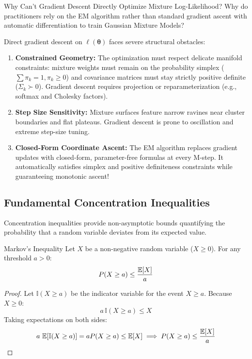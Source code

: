 \begin{ponderbox}{Why Can't Gradient Descent Directly Optimize Mixture Log-Likelihood?}
Why do practitioners rely on the EM algorithm rather than standard gradient ascent with automatic differentiation to train Gaussian Mixture Models?

\tcblower
Direct gradient descent on $\ell(\boldsymbol{\theta})$ faces severe structural obstacles:
\begin{enumerate}
    \item \textbf{Constrained Geometry:} The optimization must respect delicate manifold constraints: mixture weights must remain on the probability simplex ($\sum \pi_k = 1, \pi_k \ge 0$) and covariance matrices must stay strictly positive definite ($\Sigma_k \succ 0$). Gradient descent requires projection or reparameterization (e.g., softmax and Cholesky factors).
    \item \textbf{Step Size Sensitivity:} Mixture surfaces feature narrow ravines near cluster boundaries and flat plateaus. Gradient descent is prone to oscillation and extreme step-size tuning.
    \item \textbf{Closed-Form Coordinate Ascent:} The EM algorithm replaces gradient updates with closed-form, parameter-free formulas at every M-step. It automatically satisfies simplex and positive definiteness constraints while guaranteeing monotonic ascent!
\end{enumerate}
\end{ponderbox}

\subsection{Fundamental Concentration Inequalities}
Concentration inequalities provide non-asymptotic bounds quantifying the probability that a random variable deviates from its expected value.

\begin{theorembox}{Markov's Inequality}
Let $X$ be a non-negative random variable ($X \ge 0$). For any threshold $a > 0$:
\begin{equation}
P(X \ge a) \le \frac{\operatorname{\mathbb{E}}[X]}{a}
\label{eq:markov_ineq}
\end{equation}
\end{theorembox}

\begin{proof}
Let $\mathbb{I}(X \ge a)$ be the indicator variable for the event $X \ge a$. Because $X \ge 0$:
\begin{equation}
a \, \mathbb{I}(X \ge a) \le X
\end{equation}
Taking expectations on both sides:
\begin{equation}
a \, \operatorname{\mathbb{E}}[\mathbb{I}(X \ge a)] = a P(X \ge a) \le \operatorname{\mathbb{E}}[X] \implies P(X \ge a) \le \frac{\operatorname{\mathbb{E}}[X]}{a}
\end{equation}
\end{proof}

